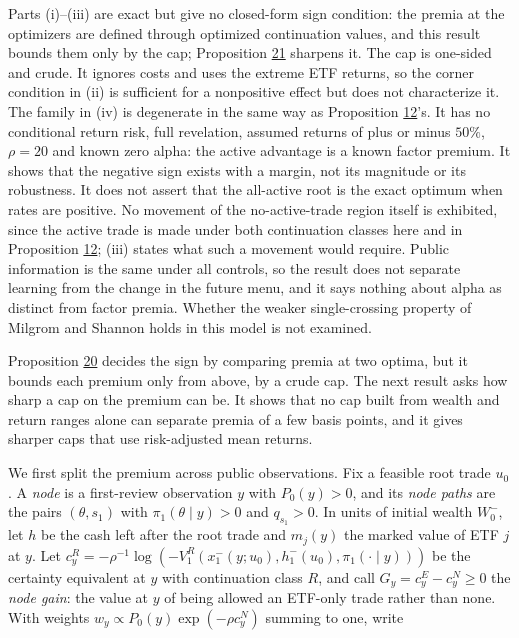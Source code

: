 \documentclass[11pt]{article}
\begin{document}
Parts (i)--(iii) are exact but give no closed-form sign
condition: the premia at the optimizers are defined through
optimized continuation values, and this result bounds them only
by the cap; Proposition \hyperref[res:Proposition-21]{21} sharpens it. The cap is one-sided and crude. It ignores costs and uses
the extreme ETF returns, so the corner condition in (ii) is
sufficient for a nonpositive effect but does not characterize
it. The family in (iv) is degenerate in the same way as
Proposition \hyperref[res:Proposition-12]{12}'s. It has no conditional return risk, full
revelation, assumed returns of plus or minus \(50\%\),
\(\rho=20\) and known zero alpha: the active advantage is a
known factor premium. It shows that the negative sign exists
with a margin, not its magnitude or its robustness. It does not
assert that the all-active root is the exact optimum when rates
are positive. No movement of the no-active-trade region itself
is exhibited, since the active trade is made under both
continuation classes here and in Proposition \hyperref[res:Proposition-12]{12}; (iii) states
what such a movement would require. Public information is the
same under all controls, so the result does not separate
learning from the change in the future menu, and it says
nothing about alpha as distinct from factor premia. Whether the
weaker single-crossing property of Milgrom and Shannon holds
in this model is not examined.

Proposition \hyperref[res:Proposition-20]{20} decides the sign by comparing premia at two
optima, but it bounds each premium only from above, by a crude
cap. The next result asks how sharp a cap on the premium can be.
It shows that no cap built from wealth and return ranges alone
can separate premia of a few basis points, and it gives sharper
caps that use risk-adjusted mean returns.

We first split the premium across public observations. Fix a
feasible root trade \(u_0\). A \emph{node} is a first-review
observation \(y\) with \(P_0(y)>0\), and its \emph{node paths} are
the pairs \((\theta,s_1)\) with \(\pi_1(\theta\mid y)>0\) and
\(q_{s_1}>0\). In units of initial wealth \(W_0^-\), let \(h\)
be the cash left after the root trade and \(m_j(y)\) the marked
value of ETF \(j\) at \(y\). Let
\(c^R_y=-\rho^{-1}\log(-V_1^R(x_1^-(y;u_0),h_1^-(u_0),\pi_1(\cdot\mid y)))\)
be the certainty equivalent at \(y\) with continuation class
\(R\), and call \(G_y=c^E_y-c^N_y\geq0\) the \emph{node gain}: the
value at \(y\) of being allowed an ETF-only trade rather than
none. With weights
\(w_y\propto P_0(y)\exp(-\rho c^N_y)\) summing to one, write
\end{document}
